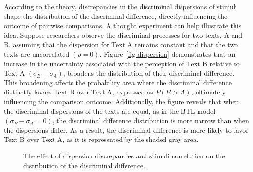 \documentclass[
  authoryear,
  review,
  1p]{elsarticle}
\begin{document}
According to the theory, discrepancies in the discriminal dispersions of
stimuli shape the distribution of the discriminal difference, directly
influencing the outcome of pairwise comparisons. A thought experiment
can help illustrate this idea. Suppose researchers observe the
discriminal processes for two texts, A and B, assuming that the
dispersion for Text A remains constant and that the two texts are
uncorrelated \((\rho=0)\). Figure~\ref{fig-dispersion} demonstrates that
an increase in the uncertainty associated with the perception of Text B
relative to Text A \((\sigma_{B} - \sigma_{A})\), broadens the
distribution of their discriminal difference. This broadening affects
the probability area where the discriminal difference distinctly favors
Text B over Text A, expressed as \(P(B>A)\), ultimately influencing the
comparison outcome. Additionally, the figure reveals that when the
discriminal dispersions of the texts are equal, as in the BTL model
\((\sigma_{B} - \sigma_{A}=0)\), the discriminal difference distribution
is more narrow than when the dispersions differ. As a result, the
discriminal difference is more likely to favor Text B over Text A, as it
is represented by the shaded gray area.

\begin{figure}

\begin{minipage}{0.50\linewidth}



\end{minipage}%
%
\begin{minipage}{0.50\linewidth}



\end{minipage}%

\caption{\label{fig-casev_issues}The effect of dispersion discrepancies
and stimuli correlation on the distribution of the discriminal
difference.}

\end{figure}%
\end{document}

